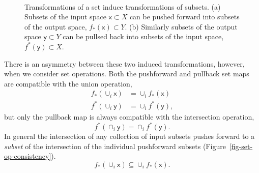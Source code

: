 \documentclass[
  letterpaper,
  DIV=11,
  numbers=noendperiod]{scrartcl}
\begin{document}
\begin{figure}
\begin{minipage}[t]{0.80\linewidth}
{{}

}

\subcaption{\label{fig-set-pullback}}
\end{minipage}%
%
\begin{minipage}[t]{0.10\linewidth}

{\centering 

~

}

\end{minipage}%

\caption{\label{fig-set-transformations}Transformations of a set induce
transformations of subsets. (a) Subsets of the input space
\(\mathsf{x} \subset X\) can be pushed forward into subsets of the
output space, \(f_{*}(\mathsf{x}) \subset Y\). (b) Similarly subsets of
the output space \(\mathsf{y} \subset Y\) can be pullsed back into
subsets of the input space, \(f^{*}(\mathsf{y})\subset X\).}

\end{figure}

There is an asymmetry between these two induced transformations,
however, when we consider set operations. Both the pushforward and
pullback set maps are compatible with the union operation,
\begin{align*}
f_{*}(\cup_{i} \mathsf{x}) &= \cup_{i} f_{*}(\mathsf{x})
\\
f^{*}(\cup_{i} \mathsf{y}) &= \cup_{i} f^{*}(\mathsf{y}),
\end{align*} but only the pullback map is always compatible with the
intersection operation, \[
f^{*}(\cap_{i} \mathsf{y}) = \cap_{i} f^{*}(\mathsf{y}).
\] In general the intersection of any collection of input subsets pushes
forward to a \emph{subset} of the intersection of the individual
pushforward subsets (Figure~\ref{fig-set-op-consistency}). \[
f_{*}(\cup_{i} \mathsf{x}) \subseteq \cup_{i} f_{*}(\mathsf{x}).
\]
\end{document}
